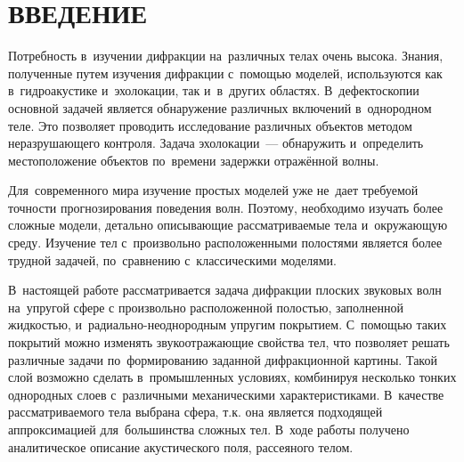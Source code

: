

\renewcommand{\bibname}{СПИСОК ИСПОЛЬЗОВАННЫХ ИСТОЧНИКОВ}
\renewcommand\refname{СПИСОК ИСПОЛЬЗОВАННЫХ ИСТОЧНИКОВ}

%

\setcounter{page}{2}
\thispagestyle {empty}
\renewcommand{\contentsname}{\centering СОДЕРЖАНИЕ}
\tableofcontents

\newpage
\section*{ВВЕДЕНИЕ}
Потребность в~изучении дифракции на~различных телах очень высока. Знания, полученные путем изучения дифракции с~помощью моделей, используются как в~гидроакустике и~эхолокации, так и~в~других областях. В~дефектоскопии основной задачей является обнаружение различных включений в~однородном теле. Это позволяет проводить исследование различных объектов методом неразрушающего контроля. Задача эхолокации~--- обнаружить и~определить местоположение объектов  по~времени задержки отражённой волны.

Для~современного мира изучение простых моделей уже не~дает требуемой точности прогнозирования поведения волн. Поэтому, необходимо изучать более сложные модели, детально описывающие рассматриваемые тела и~окружающую среду. Изучение тел с~произвольно расположенными полостями является более трудной задачей, по~сравнению с~классическими моделями. 

В~настоящей работе рассматривается задача дифракции плоских звуковых волн на~упругой сфере с произвольно расположенной полостью, заполненной жидкостью, и~радиально-неоднородным упругим покрытием. С~помощью таких покрытий можно изменять звукоотражающие свойства тел, что позволяет решать различные задачи по~формированию заданной дифракционной картины. Такой слой возможно сделать в~промышленных условиях, комбинируя несколько тонких однородных слоев с~различными механическими характеристиками. В~качестве рассматриваемого тела выбрана сфера, т.к. она является подходящей аппроксимацией для~большинства сложных тел. В~ходе работы получено аналитическое описание акустического поля, рассеяного телом.

\newpage
